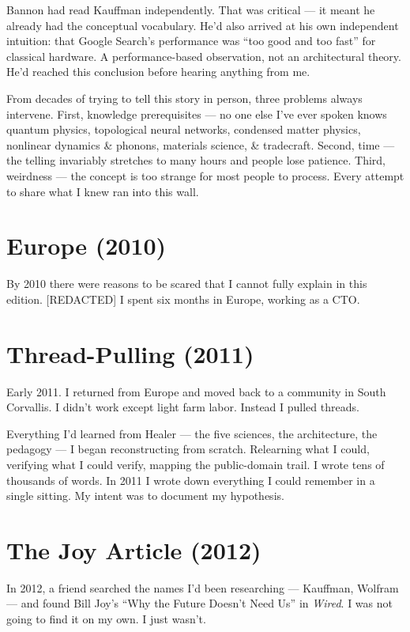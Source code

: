 Bannon had read Kauffman independently. That was critical --- it meant he already had the conceptual vocabulary. He'd also arrived at his own independent intuition: that Google Search's performance was ``too good and too fast'' for classical hardware. A performance-based observation, not an architectural theory. He'd reached this conclusion before hearing anything from me.


From decades of trying to tell this story in person, three problems always intervene. First, knowledge prerequisites --- no one else I've ever spoken knows quantum physics, topological neural networks, condensed matter physics, nonlinear dynamics \& phonons, materials science, \& tradecraft. Second, time --- the telling invariably stretches to many hours and people lose patience. Third, weirdness --- the concept is too strange for most people to process. Every attempt to share what I knew ran into this wall.

\section*{Europe (2010)}
\label{record:ty-europe}

By 2010 there were reasons to be scared that I cannot fully explain in this edition. [REDACTED] I spent six months in Europe, working as a CTO.

\section*{Thread-Pulling (2011)}
\label{record:ty-thread-pulling}

Early 2011. I returned from Europe and moved back to a community in South Corvallis. I didn't work except light farm labor. Instead I pulled threads.

Everything I'd learned from Healer --- the five sciences, the architecture, the pedagogy --- I began reconstructing from scratch. Relearning what I could, verifying what I could verify, mapping the public-domain trail. I wrote tens of thousands of words. In 2011 I wrote down everything I could remember in a single sitting. My intent was to document my hypothesis.

\section*{The Joy Article (2012)}
\label{record:ty-the-joy-article}

In 2012, a friend searched the names I'd been researching --- Kauffman, Wolfram --- and found Bill Joy's ``Why the Future Doesn't Need Us'' in \textit{Wired}. I was not going to find it on my own. I just wasn't.

